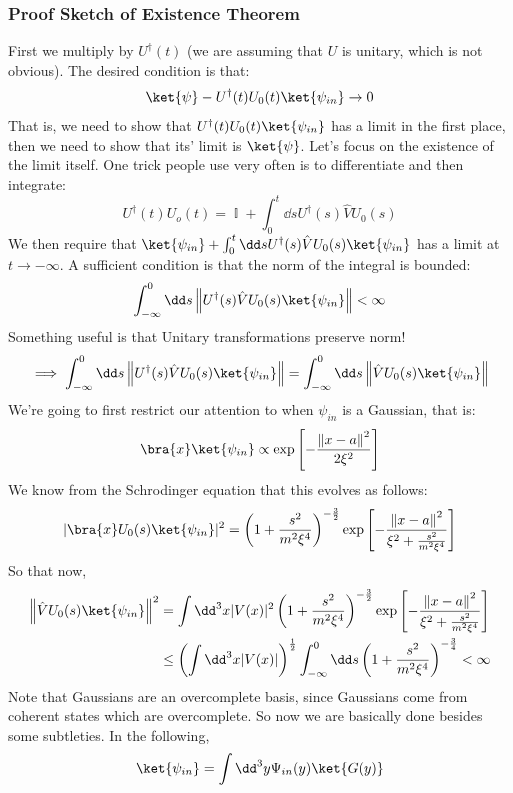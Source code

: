 \documentclass{article}
\DeclareMathOperator{\II}{\mathbb{I}}
\renewcommand{\norm}[1]{\left\lVert#1\right\rVert}
\begin{document}
\subsubsection{Proof Sketch of Existence Theorem}
First we multiply by $U^\dagger(t)$ (we are assuming that $U$ is unitary, which is not obvious). The desired condition is that:
\[\ket{\psi}-U^\dagger(t)U_0(t)\ket{\psi_{in}}\to 0\]
That is, we need to show that $U^\dagger(t)U_0(t)\ket{\psi_{in}}$ has a limit in the first place, then we need to show that its' limit is $\ket{\psi}$. Let's focus on the existence of the limit itself. One trick people use very often is to differentiate and then integrate:
\begin{equation}\label{scattering_exercise_1}U^\dagger(t)U_o(t) = \II+ \int_0^t \dd s U^\dagger(s) \hat V U_0(s) \end{equation}
We then require that $\ket{\psi_{in}}+ \int_0^t \dd s U^\dagger(s) \hat V U_0(s)\ket{\psi_{in}}$ has a limit at $t\to -\infty$. A sufficient condition is that the norm of the integral is bounded:
\[\int_{-\infty}^0 \dd s \norm{U^\dagger(s) \hat V U_0(s) \ket{\psi_{in}}} < \infty\]
Something useful is that Unitary transformations preserve norm!
\[\implies \int_{-\infty}^0 \dd s \norm{U^\dagger(s) \hat V U_0(s) \ket{\psi_{in}}}  = \int_{-\infty}^0 \dd s \norm{\hat V U_0(s) \ket{\psi_{in}}}\]
We're going to first restrict our attention to when $\psi_{in}$ is a Gaussian, that is:
\[\bra{x}\ket{\psi_{in}} \propto \exp\left[-\frac{\norm{x-a}^2}{2\xi^2}\right]\]
We know from the Schrodinger equation that this evolves as follows:
\begin{equation} |\bra{x}U_0(s)\ket{\psi_{in}}|^2= \left(1+\frac{s^2}{m^2\xi^4}\right)^{-\frac{3}{2}}\exp\left[-\frac{\norm{x-a}^2}{\xi^2+\frac{s^2}{m^2\xi^4}}\right]\end{equation}
So that now,
\begin{align} \norm{\hat V U_0(s)\ket{\psi_{in}}}^2 &= \int \dd^3 x |V(x)|^2\left(1+\frac{s^2}{m^2\xi^4}\right)^{-\frac{3}{2}}\exp\left[-\frac{\norm{x-a}^2}{\xi^2+\frac{s^2}{m^2\xi^4}}\right] \\
& \leq \left(\int \dd ^3 x|V(x)|\right)^{\frac{1}{2}}\int_{-\infty}^0 \dd s \left(1+\frac{s^2}{m^2\xi^4}\right)^{-\frac{3}{4}}<\infty \label{scattering_exericse_2}\end{align}
Note that Gaussians are an overcomplete basis, since Gaussians come from coherent states which are overcomplete. So now we are basically done besides some subtleties. In the following,
\[\ket{\psi_{in}} = \int \dd^3 y \Psi_{in}(y)\ket{G(y)}\]
\end{document}
